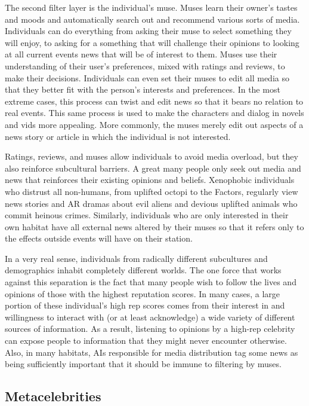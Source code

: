 The second filter layer is the individual's muse. 
Muses learn their owner's tastes and moods and automatically
search out and recommend various sorts
of media. Individuals can do everything from asking 
their muse to select something they will enjoy, to 
asking for a something that will challenge their opinions
to looking at all current events news that will
be of interest to them. Muses use their understanding 
of their user's preferences, mixed with ratings and 
reviews, to make their decisions. Individuals can even 
set their muses to edit all media so that they better fit 
with the person's interests and preferences. In the most 
extreme cases, this process can twist and edit news 
so that it bears no relation to real events. This same 
process is used to make the characters and dialog in 
novels and vids more appealing. More commonly, the 
muses merely edit out aspects of a news story or article
in which the individual is not interested.

Ratings, reviews, and muses allow individuals 
to avoid media overload, but they also reinforce 
subcultural barriers. A great many people only seek 
out media and news that reinforces their existing 
opinions and beliefs. Xenophobic individuals who 
distrust all non-humans, from uplifted octopi to the 
Factors, regularly view news stories and AR dramas 
about evil aliens and devious uplifted animals who 
commit heinous crimes. Similarly, individuals who are 
only interested in their own habitat have all external 
news altered by their muses so that it refers only to 
the effects outside events will have on their station.

In a very real sense, individuals from radically 
different subcultures and demographics inhabit completely
different worlds. The one force that works
against this separation is the fact that many people 
wish to follow the lives and opinions of those with 
the highest reputation scores. In many cases, a large 
portion of these individual's high rep scores comes 
from their interest in and willingness to interact with 
(or at least acknowledge) a wide variety of different 
sources of information. As a result, listening to opinions
by a high-rep celebrity can expose people to information
that they might never encounter otherwise.
Also, in many habitats, AIs responsible for media distribution
tag some news as being sufficiently important
that it should be immune to filtering by muses.

\subsection{Metacelebrities}

